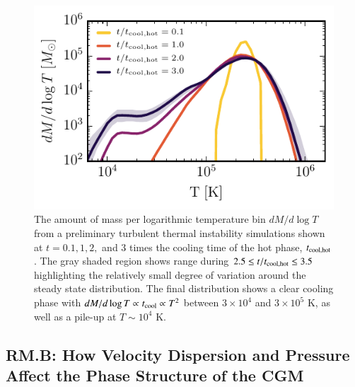 \documentclass[11pt,letterpaper,english]{article}
\begin{document}
\begin{figure}[t]
    \centering
    \begin{minipage}{0.5\textwidth}
        \includegraphics[width=1.\textwidth]{dMdlogT_proposal_t.pdf} 
    \end{minipage}\hfill
    \begin{minipage}{0.5\textwidth}
	\caption{  The amount of mass per logarithmic temperature bin $dM / d\log T$ from a preliminary turbulent thermal instability simulations shown at $t = 0.1,1,2,$ and $3$ times the cooling time of the hot phase, $t_{\rm cool,hot}$. The gray shaded region shows range during $ 2.5 \leq t / t_{\rm cool,hot} \leq 3.5$ highlighting the relatively small degree of variation around the steady state distribution. The final distribution shows a clear cooling phase with $dM / d\log T \propto t_{\rm cool} \propto T^2$ between $3\times10^4$ and $3\times10^5$ K, as well as a pile-up at $T\sim10^4$ K. \label{fig:sim_phase}}
    \end{minipage}
\end{figure}


\vspace{-.25in}
\subsection{RM.B: How Velocity Dispersion and Pressure Affect the Phase Structure of the CGM}
\vspace{-.2in}
\end{document}
